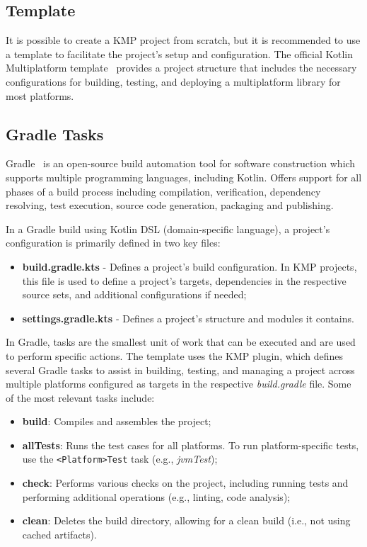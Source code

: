 \subsection{Template}\label{subsec:template}

It is possible to create a KMP project from scratch, but it is recommended to use a template to facilitate the project's setup and configuration.
The official Kotlin Multiplatform template~\cite{kmp-github-template} provides a project structure
that includes the necessary configurations for building,
testing,
and deploying a multiplatform library for most platforms.

\subsection{Gradle Tasks}\label{subsec:available-gradle-tasks}

Gradle~\cite{gradle} is an open-source build automation tool for software construction which supports multiple programming languages, including Kotlin.
Offers support for all phases of a build process including compilation, verification, dependency resolving, test execution, source code generation, packaging and publishing.

In a Gradle build using Kotlin DSL (domain-specific language), a project's configuration is primarily defined in two key files:

\begin{itemize}
    \item \textbf{build.gradle.kts} - Defines a project's build configuration.
    In KMP projects, this file is used to define a project's targets, dependencies in the respective source sets, and additional configurations if needed;
    \item \textbf{settings.gradle.kts} - Defines a project's structure and modules it contains.
\end{itemize}

In Gradle, tasks are the smallest unit of work that can be executed and are used to perform specific actions. The template uses the KMP plugin, which defines several Gradle tasks to assist in building, testing, and managing a project across multiple platforms configured as targets in the respective \textit{build.gradle} file.
Some of the most relevant tasks include:

\begin{itemize}
    \item \textbf{build}: Compiles and assembles the project;
    \item \textbf{allTests}: Runs the test cases for all platforms.
    To run platform-specific tests, use the \texttt{<Platform>Test} task (e.g., \textit{jvmTest});
    \item \textbf{check}: Performs various checks on the project, including running tests and performing additional operations (e.g., linting, code analysis);
    \item \textbf{clean}: Deletes the build directory, allowing for a clean build (i.e., not using cached artifacts).
\end{itemize}

